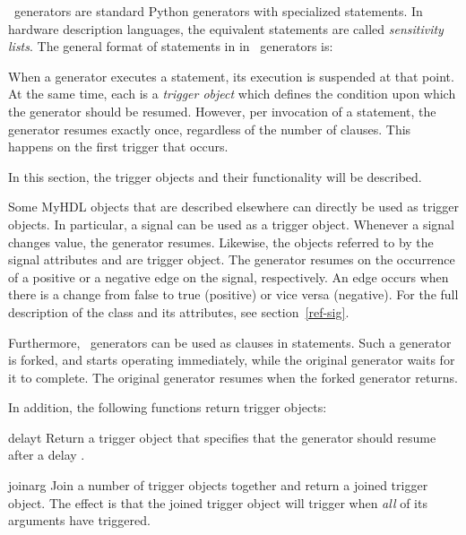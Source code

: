 \myhdl\ generators are standard Python generators with specialized
 statements. In hardware description languages, the equivalent
statements are called 
\emph{sensitivity lists}. The general format
of  statements in in \myhdl\ generators is:

\hspace{\leftmargin} 

When a generator executes a  statement, its
execution is suspended at that point. At the same time, each
 is a \emph{trigger object} which defines the condition
upon which the generator should be resumed. However, per invocation of a
 statement, the generator resumes exactly once,
regardless of the number of clauses. This happens on the
first trigger that occurs.

In this section, the trigger objects and their functionality will be
described.

Some MyHDL objects that are described elsewhere can directly be used
as trigger objects. In particular, a signal can be used as
a trigger object. Whenever a signal changes value, the generator
resumes. Likewise, the objects referred to by the signal attributes
 and  are trigger object. The generator
resumes on the occurrence of a positive or a negative edge on the
signal, respectively. An edge occurs when there is a change from
false to true (positive) or vice versa (negative).
For the full description of the  class and its
attributes, see section~\ref{ref-sig}.

Furthermore, \myhdl\ generators can be used as clauses in 
statements. Such a generator is forked, and starts operating
immediately, while the original generator
waits for it to complete. The original generator resumes when the
forked generator returns.


In addition, the following functions return trigger objects:

\begin{funcdesc}{delay}{t}
Return a trigger object that specifies that the generator should
resume after a delay .
\end{funcdesc}

\begin{funcdesc}{join}{arg }
Join a number of trigger objects together and return a joined
trigger object.  The effect is that the joined trigger object will
trigger when \emph{all} of its arguments have triggered.
\end{funcdesc}


